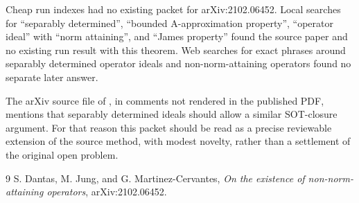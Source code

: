 \documentclass[11pt]{amsart}
\begin{document}
Cheap run indexes had no existing packet for arXiv:2102.06452.  Local searches
for ``separably determined'', ``bounded A-approximation property'', ``operator
ideal'' with ``norm attaining'', and ``James property'' found the source paper
and no existing run result with this theorem.  Web searches for exact phrases
around separably determined operator ideals and non-norm-attaining operators
found no separate later answer.

The arXiv source file of \cite{DJM}, in comments not rendered in the published
PDF, mentions that separably determined ideals should allow a similar
SOT-closure argument.  For that reason this packet should be read as a precise
reviewable extension of the source method, with modest novelty, rather than a
settlement of the original open problem.

\begin{thebibliography}{9}
S. Dantas, M. Jung, and G. Martinez-Cervantes,
\emph{On the existence of non-norm-attaining operators},
arXiv:2102.06452.
\end{thebibliography}
\end{document}
